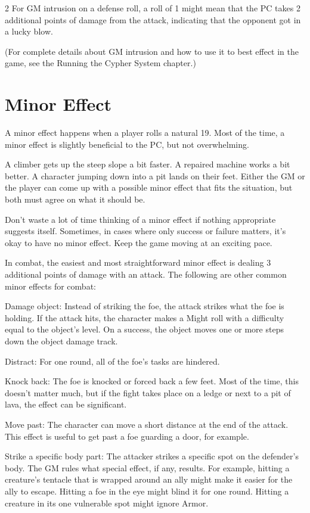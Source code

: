 \begin{multicols}{2}
For GM intrusion on a defense roll, a roll of 1 might mean that the PC takes 2 additional points of damage from the attack, indicating that the opponent got in a lucky blow.

(For complete details about GM intrusion and how to use it to best effect in the game, see the Running the Cypher System chapter.)

\section{Minor Effect}

A minor effect happens when a player rolls a natural 19. Most of the time, a minor effect is slightly beneficial to the PC, but not overwhelming.

A climber gets up the steep slope a bit faster. A repaired machine works a bit better. A character jumping down into a pit lands on their feet. Either the GM or the player can come up with a possible minor effect that fits the situation, but both must agree on what it should be.

Don’t waste a lot of time thinking of a minor effect if nothing appropriate suggests itself. Sometimes, in cases where only success or failure matters, it’s okay to have no minor effect. Keep the game moving at an exciting pace.

In combat, the easiest and most straightforward minor effect is dealing 3 additional points of damage with an attack. The following are other common minor effects for combat:

Damage object: Instead of striking the foe, the attack strikes what the foe is holding. If the attack hits, the character makes a Might roll with a difficulty equal to the object’s level. On a success, the object moves one or more steps down the object damage track.

Distract: For one round, all of the foe’s tasks are hindered.

Knock back: The foe is knocked or forced back a few feet. Most of the time, this doesn’t matter much, but if the fight takes place on a ledge or next to a pit of lava, the effect can be significant.

Move past: The character can move a short distance at the end of the attack. This effect is useful to get past a foe guarding a door, for example.

Strike a specific body part: The attacker strikes a specific spot on the defender’s body. The GM rules what special effect, if any, results. For example, hitting a creature’s tentacle that is wrapped around an ally might make it easier for the ally to escape. Hitting a foe in the eye might blind it for one round. Hitting a creature in its one vulnerable spot might ignore Armor.


\end{multicols}
